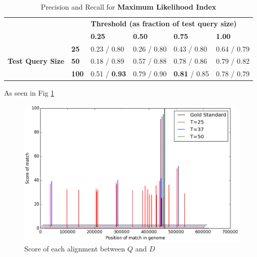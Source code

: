 \documentclass[12pt]{IEEEtran}
\begin{document}
\begin{table}[]
\centering
\caption{Precision and Recall for \textbf{Maximum Likelihood Index}}
\label{my-label}
\begin{tabular}{ll|llll}
\cline{3-6}
                                                       &              & \multicolumn{4}{l|}{\textbf{Threshold (as fraction of test query size)}}                                                                          \\ \cline{3-6} 
\textbf{}                                              &              & \multicolumn{1}{l|}{\textbf{0.25}} & \multicolumn{1}{l|}{\textbf{0.50}} & \multicolumn{1}{l|}{\textbf{0.75}} & \multicolumn{1}{l|}{\textbf{1.00}} \\ \hline
\multicolumn{1}{|l|}{\multirow{3}{*}{\textbf{Test Query Size}}} & \textbf{25}  & 0.23 / 0.80                         & 0.26 / 0.80                         & 0.43 / 0.80                        & 0.64 / 0.79                        \\ \cline{2-2}
\multicolumn{1}{|l|}{}                                 & \textbf{50}  & 0.18 / 0.89                        & 0.57 / 0.88                         & 0.78 / 0.86                         & 0.79 / 0.82                        \\ \cline{2-2}
\multicolumn{1}{|l|}{}                                 & \textbf{100} & 0.51 / \textbf{0.93}                          & 0.79 / 0.90                       & \textbf{0.81} / 0.85                         & 0.78 / 0.79                          \\ \cline{1-2}
\end{tabular}
\end{table}

As seen in Fig \ref{dists}
\begin{figure}
    \centering
    \includegraphics[scale=0.7]{dists}
    \caption{Score of each alignment between $Q$ and $D$}
    \label{dists}
\end{figure}
\end{document}
